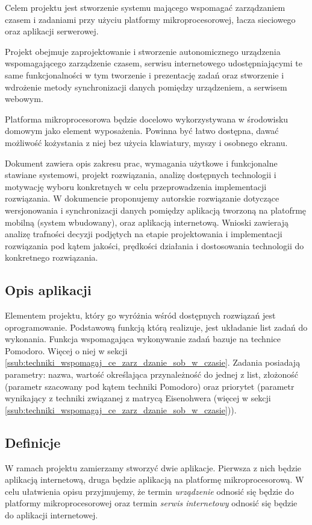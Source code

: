 Celem projektu jest stworzenie systemu mającego wspomagać zarządzaniem czasem i zadaniami przy użyciu platformy mikroprocesorowej, łacza sieciowego oraz aplikacji serwerowej.

Projekt obejmuje zaprojektowanie i stworzenie autonomicznego urządzenia wspomagającego zarządzenie czasem, serwisu internetowego udostępniającymi te same funkcjonalności w tym tworzenie i prezentację zadań oraz stworzenie i wdrożenie metody synchronizacji danych pomiędzy urządzeniem, a serwisem webowym.

Platforma mikroprocesorowa będzie docelowo wykorzystywana w środowisku domowym jako element wyposażenia. Powinna być łatwo dostępna, dawać możliwość kożystania z niej bez użycia klawiatury, myszy i osobnego ekranu.

Dokument zawiera opis zakresu prac, wymagania użytkowe i funkcjonalne stawiane systemowi, projekt rozwiązania, analizę dostępnych technologii i motywację wyboru konkretnych w celu przeprowadzenia implementacji rozwiązania. W dokumencie proponujemy autorskie rozwiązanie dotyczące wersjonowania i synchronizacji danych pomiędzy aplikacją tworzoną na platofrmę mobilną (system wbudowany), oraz aplikacją internetową. Wnioski zawierają analizę trafności decyzji podjętych na etapie projektowania i implementacji rozwiązania pod kątem jakości, prędkości działania i dostosowania technologii do konkretnego rozwiązania.

\subsection{Opis aplikacji}
\label{sub:Opis aplikacji}

Elementem projektu, który go wyróżnia wśród dostępnych rozwiązań jest oprogramowanie. Podstawową funkcją którą realizuje, jest układanie list zadań do wykonania. Funkcja wspomagająca wykonywanie zadań bazuje na technice Pomodoro. Więcej o niej w sekcji \ref{ssub:techniki_wspomagaj_ce_zarz_dzanie_sob_w_czasie}. Zadania posiadają parametry: nazwa, wartość określająca przynależność do jednej z list, złożoność (parametr szacowany pod kątem techniki Pomodoro) oraz priorytet (parametr wynikający z techniki związanej z matrycą Eisenohwera (więcej w sekcji \ref{ssub:techniki_wspomagaj_ce_zarz_dzanie_sob_w_czasie})).

\subsection{Definicje} %
\label{sec:definicje}
W ramach projektu zamierzamy stworzyć dwie aplikacje. Pierwsza z nich będzie aplikacją internetową, druga będzie aplikacją na platformę mikroprocesorową. W celu ułatwienia opisu przyjmujemy, że termin \textit{urządzenie} odnosić się będzie do platformy mikroprocesorowej oraz termin \textit{serwis internetowy} odnosić się będzie do aplikacji internetowej.


